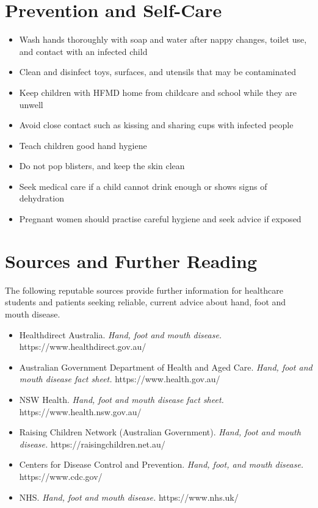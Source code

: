 \section*{Prevention and Self-Care}
\begin{itemize}
    \item Wash hands thoroughly with soap and water after nappy changes, toilet use, and contact with an infected child
    \item Clean and disinfect toys, surfaces, and utensils that may be contaminated
    \item Keep children with HFMD home from childcare and school while they are unwell
    \item Avoid close contact such as kissing and sharing cups with infected people
    \item Teach children good hand hygiene
    \item Do not pop blisters, and keep the skin clean
    \item Seek medical care if a child cannot drink enough or shows signs of dehydration
    \item Pregnant women should practise careful hygiene and seek advice if exposed
\end{itemize}

\section*{Sources and Further Reading}
The following reputable sources provide further information for healthcare students and patients seeking reliable, current advice about hand, foot and mouth disease.

\begin{itemize}
    \item Healthdirect Australia. \textit{Hand, foot and mouth disease.} https://www.healthdirect.gov.au/
    \item Australian Government Department of Health and Aged Care. \textit{Hand, foot and mouth disease fact sheet.} https://www.health.gov.au/
    \item NSW Health. \textit{Hand, foot and mouth disease fact sheet.} https://www.health.nsw.gov.au/
    \item Raising Children Network (Australian Government). \textit{Hand, foot and mouth disease.} https://raisingchildren.net.au/
    \item Centers for Disease Control and Prevention. \textit{Hand, foot, and mouth disease.} https://www.cdc.gov/
    \item NHS. \textit{Hand, foot and mouth disease.} https://www.nhs.uk/
\end{itemize}
